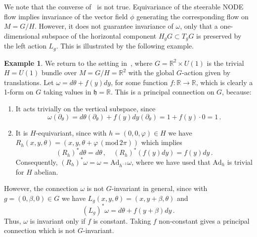 \documentclass[12pt,a4paper]{article}
\numberwithin{equation}{section}
\newcommand{\R}{\mathbb{R}}
\theoremstyle{plain}
\theoremstyle{definition}
\newtheorem{example}[theorem]{Example}
\theoremstyle{remark}
\begin{document}
We note that the converse of~ is not true. Equivariance of the steerable NODE flow implies invariance of the vector field $\phi$ generating the corresponding flow on $M=G/H$. However, it does not guarantee invariance of $\omega$, only that a one-dimensional subspace of the horizontal component $H_gG \subset T_gG$ is preserved by the left action $L_g$. This is illustrated by the following example.
\begin{example}
    We return to the setting in~, where $G = \R^2 \times U(1)$ is the trivial $H=U(1)$ bundle over $M=G/H=\R^2$ with the global $G$-action given by translations. Let $\omega = d\theta + f(y)dy$, for some function $f:\R \to \R$, which is clearly a 1-form on $G$ taking values in $\mathfrak{h} = \R$. This is a principal connection on $G$, because:
    \begin{enumerate}
        \item[(i)] It acts trivially on the vertical subspace, since
        \begin{equation}
            \omega(\partial_{\theta}) = d\theta(\partial_{\theta}) + f(y)dy(\partial_{\theta}) = 1 + f(y)\cdot0 = 1 \,.
        \end{equation}
        \item[(ii)] It is $H$-equivariant, since with $h=(0,0,\varphi) \in H$ we have $R_h(x,y,\theta) = (x,y,\theta+\varphi \, (\mathrm{mod}\, 2\pi))$ which implies
        \begin{equation}
            (R_h)^*d\theta = d\theta \,, \quad (R_h)^*(f(y)dy) = f(y)dy \,. 
        \end{equation}
        Consequently, $(R_h)^*\omega = \omega = \mathrm{Ad}_{h^{-1}}\omega$, where we have used that $\mathrm{Ad}_{h}$ is trivial for $H$ abelian.
    \end{enumerate}
    However, the connection $\omega$ is not $G$-invariant in general, since with $g = (0,\beta,0) \in G$ we have $L_g(x,y,\theta) = (x,y+\beta,\theta)$ and
    \begin{equation}
        (L_g)^*\omega = d\theta + f(y+\beta)dy \,.
    \end{equation}
    Thus, $\omega$ is invariant only if $f$ is constant. Taking $f$ non-constant gives a principal connection which is not $G$-invariant.


\end{example}
\end{document}
